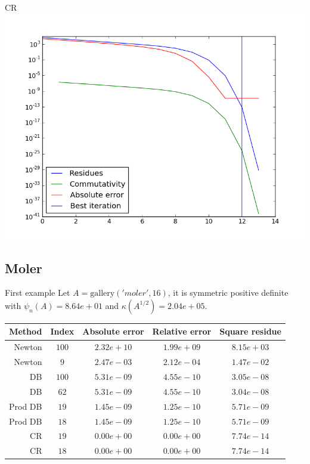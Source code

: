 \documentclass{beamer}
\theoremstyle{plain}
\theoremstyle{definition}
\theoremstyle{remark}
\begin{document}
\begin{frame}{CR}
  \includegraphics[width=\textwidth,height=\textheight]{"e1/CR - absplot"}
\end{frame}

\subsection{Moler}

\begin{frame}{First example}
  Let $A = \mathrm{gallery}('moler',16)$, it is symmetric positive
  definite with $\psi_n(A) = 8.64e+01$ and $\kappa(A^{1/2}) = 2.04e+05$.

  \begin{tabular}{r| c c c c}
    Method & Index & Absolute error & Relative error & Square residue \\
    \hline
    Newton & $100$ & $2.32e+10$ & $1.99e+09$ & $8.15e+03$ \\
    Newton & $9$ & $2.47e-03$ & $2.12e-04$ & $1.47e-02$ \\
    \hline
    DB & $100$ & $5.31e-09$ & $4.55e-10$ & $3.05e-08$ \\
    DB & $62$ & $5.31e-09$ & $4.55e-10$ & $3.04e-08$ \\
    \hline
    Prod DB & $19$ & $1.45e-09$ & $1.25e-10$ & $5.71e-09$ \\
    Prod DB & $18$ & $1.45e-09$ & $1.25e-10$ & $5.71e-09$ \\
    \hline
    CR & $19$ & $0.00e+00$ & $0.00e+00$ & $7.74e-14$ \\
    CR & $18$ & $0.00e+00$ & $0.00e+00$ & $7.74e-14$ \\
  \end{tabular}  
\end{frame}
\end{document}

